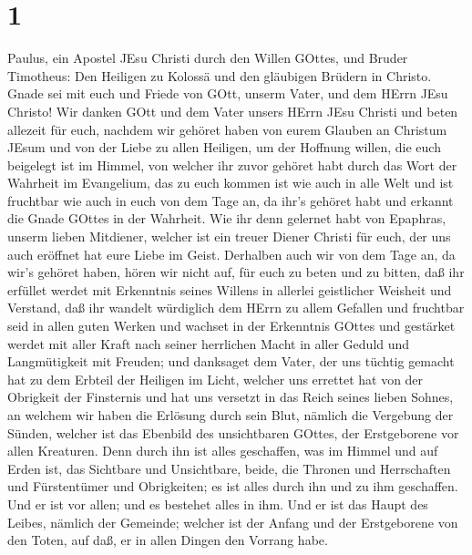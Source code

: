 \hypertarget{section}{%
\section{1}\label{section}}

 Paulus, ein Apostel JEsu Christi durch den Willen GOttes,
und Bruder Timotheus:  Den Heiligen zu Kolossä und den
gläubigen Brüdern in Christo. Gnade sei mit euch und Friede von GOtt,
unserm Vater, und dem HErrn JEsu Christo!  Wir danken GOtt
und dem Vater unsers HErrn JEsu Christi und beten allezeit für euch,
 nachdem wir gehöret haben von eurem Glauben an Christum
JEsum und von der Liebe zu allen Heiligen,  um der Hoffnung
willen, die euch beigelegt ist im Himmel, von welcher ihr zuvor gehöret
habt durch das Wort der Wahrheit im Evangelium,  das zu euch
kommen ist wie auch in alle Welt und ist fruchtbar wie auch in euch von
dem Tage an, da ihr's gehöret habt und erkannt die Gnade GOttes in der
Wahrheit.  Wie ihr denn gelernet habt von Epaphras, unserm
lieben Mitdiener, welcher ist ein treuer Diener Christi für euch,
 der uns auch eröffnet hat eure Liebe im Geist. 
Derhalben auch wir von dem Tage an, da wir's gehöret haben, hören wir
nicht auf, für euch zu beten und zu bitten, daß ihr erfüllet werdet mit
Erkenntnis seines Willens in allerlei geistlicher Weisheit und Verstand,
 daß ihr wandelt würdiglich dem HErrn zu allem Gefallen und
fruchtbar seid in allen guten Werken  und wachset in der
Erkenntnis GOttes und gestärket werdet mit aller Kraft nach seiner
herrlichen Macht in aller Geduld und Langmütigkeit mit Freuden;
 und danksaget dem Vater, der uns tüchtig gemacht hat zu
dem Erbteil der Heiligen im Licht,  welcher uns errettet
hat von der Obrigkeit der Finsternis und hat uns versetzt in das Reich
seines lieben Sohnes,  an welchem wir haben die Erlösung
durch sein Blut, nämlich die Vergebung der Sünden,  welcher
ist das Ebenbild des unsichtbaren GOttes, der Erstgeborene vor allen
Kreaturen.  Denn durch ihn ist alles geschaffen, was im
Himmel und auf Erden ist, das Sichtbare und Unsichtbare, beide, die
Thronen und Herrschaften und Fürstentümer und Obrigkeiten; es ist alles
durch ihn und zu ihm geschaffen.  Und er ist vor allen; und
es bestehet alles in ihm.  Und er ist das Haupt des Leibes,
nämlich der Gemeinde; welcher ist der Anfang und der Erstgeborene von
den Toten, auf daß, er in allen Dingen den Vorrang habe. 
